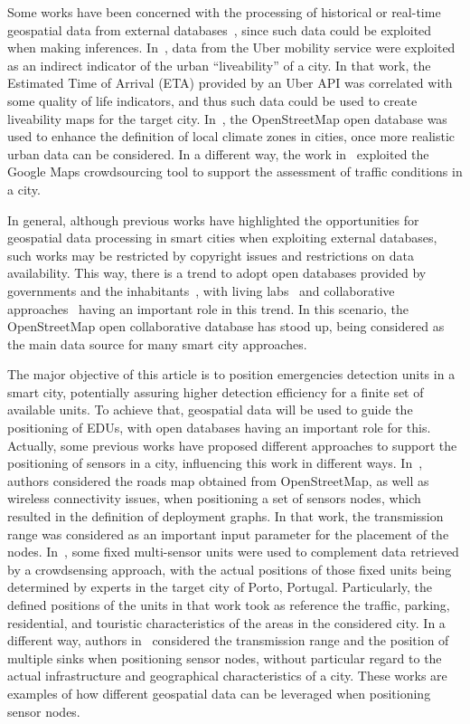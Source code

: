 \begin{refsection}
Some works have been concerned with the processing of historical or real-time geospatial data from external databases~\cite{realtimegis}, since such data could be exploited when making inferences. In~\cite{uberdata1}, data from the Uber mobility service were exploited as an indirect indicator of the urban ``liveability'' of a city. In that work, the Estimated Time of Arrival (ETA) provided by an Uber API was correlated with some quality of life indicators, and thus such data could be used to create liveability maps for the target city. In~\cite{openstreetmap2}, the OpenStreetMap open database was used to enhance the definition of local climate zones in cities, once more realistic urban data can be considered. In a different way, the work in~\cite{googlemaps} exploited the Google Maps crowdsourcing tool to support the assessment of traffic conditions in a city.

In general, although previous works have highlighted the opportunities for geospatial data processing in smart cities when exploiting external databases, such works may be restricted by copyright issues and restrictions on data availability. This way, there is a trend to adopt open databases provided by governments and the inhabitants~\cite{opendatabase1}, with living labs~\cite{livinglab} and collaborative approaches~\cite{cityspeed} having an important role in this trend. In this scenario, the OpenStreetMap open collaborative database has stood up, being considered as the main data source for many smart city approaches. 

The major objective of this article is to position emergencies detection units in a smart city, potentially assuring higher detection efficiency for a finite set of available units. To achieve that, geospatial data will be used to guide the positioning of EDUs, with open databases having an important role for this. Actually, some previous works have proposed different approaches to support the positioning of sensors in a city, influencing this work in different ways. In~\cite{positioning1}, authors considered the roads map obtained from OpenStreetMap, as well as wireless connectivity issues, when positioning a set of sensors nodes, which resulted in the definition of deployment graphs. In that work, the transmission range was considered as an important input parameter for the placement of the nodes. In~\cite{positions2}, some fixed multi-sensor units were used to complement data retrieved by a crowdsensing approach, with the actual positions of those fixed units being determined by experts in the target city of Porto, Portugal. Particularly, the defined positions of the units in that work took as reference the traffic, parking, residential, and touristic characteristics of the areas in the considered city. In a different way, authors in~\cite{positioning3} considered the transmission range and the position of multiple sinks when positioning sensor nodes, without particular regard to the actual infrastructure and geographical characteristics of a city. These works are examples of how different geospatial data can be leveraged when positioning sensor nodes.  


\end{refsection}
